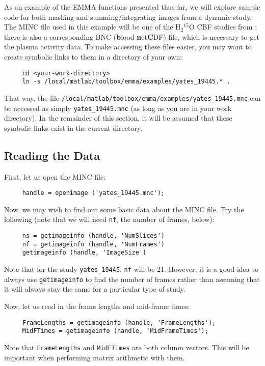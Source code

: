 As an example of the EMMA functions presented thus far, we will
explore sample code for both masking and summing/integrating images
from a dynamic study.  The MINC file used in this example will be one
of the H$_2$$^{15}$O CBF studies from
; there is also a
corresponding BNC ({\bf b}lood {\bf n}et{\bf C}DF) file, which is
necessary to get the plasma activity data.  To make accessing
these files easier, you may want to create symbolic links to them in a
directory of your own:
\begin{verbatim}
     cd <your-work-directory>
     ln -s /local/matlab/toolbox/emma/examples/yates_19445.* .
\end{verbatim}
That way, the file
\verb|/local/matlab/toolbox/emma/examples/yates_19445.mnc| can be
accessed as simply \verb|yates_19445.mnc| (as long as you are in your
work directory).  In the remainder of this section, it will be assumed
that these symbolic links exist in the current directory.

\subsection{Reading the Data}

First, let us open the MINC file:
\begin{verbatim}
     handle = openimage ('yates_19445.mnc');
\end{verbatim}
Now, we may wish to find out some basic data about the MINC file.  Try
the following (note that we will need \verb|nf|, the number of frames,
below):
\begin{verbatim}
     ns = getimageinfo (handle, 'NumSlices')
     nf = getimageinfo (handle, 'NumFrames')
     getimageinfo (handle, 'ImageSize')
\end{verbatim}
Note that for the study \verb|yates_19445|, \verb|nf| will be 21.
However, it is a good idea to always use \verb|getimageinfo| to find
the number of frames rather than assuming that it will always stay the
same for a particular type of study.

Now, let us read in the frame lengths and mid-frame times:
\begin{verbatim}
     FrameLengths = getimageinfo (handle, 'FrameLengths');
     MidFTimes = getimageinfo (handle, 'MidFrameTimes');
\end{verbatim}
Note that \verb|FrameLengths| and \verb|MidFTimes| are both column
vectors.  This will be important when performing matrix arithmetic
with them.

